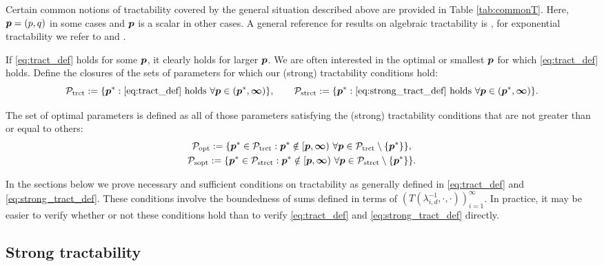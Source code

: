 \documentclass[sort&compress]{elsarticle}
\begin{document}
Certain common notions of tractability  covered by the general situation described above are provided in Table \ref{tab:commonT}.  Here, $\boldsymbol{p} = (p,q)$ in some cases and $\boldsymbol{p}$ is a scalar in other cases. A general reference
for results on algebraic tractability is \cite{NovWoz08a}, for exponential tractability we refer to \cite{HicKriWoz19a} and \cite{KriWoz19a}.

If \eqref{eq:tract_def} holds for some $\boldsymbol{p}$, it clearly holds for larger $\boldsymbol{p}$.  We are often interested in the optimal or smallest $\boldsymbol{p}$ for which \eqref{eq:tract_def} holds.  Define the closures of the sets of parameters for which our (strong) tractability conditions hold:
\begin{equation*}
	\mathcal{P}_{\textup{trct}} : = \{\boldsymbol{p}^* : \eqref{eq:tract_def} \text{ holds }\forall \boldsymbol{p} \in (\boldsymbol{p}^*,\boldsymbol{\infty})\}, \qquad
	\mathcal{P}_{\textup{strct}} : = \{\boldsymbol{p}^* : \eqref{eq:strong_tract_def} \text{ holds }\forall \boldsymbol{p} \in (\boldsymbol{p}^*,\boldsymbol{\infty})\}.
\end{equation*}

\begin{definition}
    The  set of optimal parameters is defined as all of those parameters satisfying the (strong) tractability conditions that are not greater than or equal to others:
\begin{gather}
	\label{eq:Poptdef}
	\mathcal{P}_{\textup{opt}} : = \{\boldsymbol{p}^* \in \mathcal{P}_{\textup{trct}} :  \boldsymbol{p}^* \notin [\boldsymbol{p},\boldsymbol{\infty}) \ \forall \boldsymbol{p} \in  \mathcal{P}_{\textup{trct}} \setminus \{\boldsymbol{p}^*\} \}, \\
	\label{eq:Psoptdef}
	\mathcal{P}_{\textup{sopt}} : = \{\boldsymbol{p}^* \in \mathcal{P}_{\textup{strct}} :  \boldsymbol{p}^* \notin [\boldsymbol{p},\boldsymbol{\infty}) \ \forall \boldsymbol{p} \in  \mathcal{P}_{\textup{strct}} \setminus \{\boldsymbol{p}^*\} \}.
\end{gather}
\end{definition}


In the sections below we prove necessary and sufficient conditions on tractability as generally defined in \eqref{eq:tract_def} and \eqref{eq:strong_tract_def}.  These conditions involve the boundedness of sums defined in terms of $(T(\lambda_{i,d}^{-1},\cdot, \cdot))_{i=1}^\infty$.  In practice, it may be easier to verify whether or not these conditions hold than to verify \eqref{eq:tract_def} and \eqref{eq:strong_tract_def} directly.




\subsection{Strong tractability}
\end{document}
